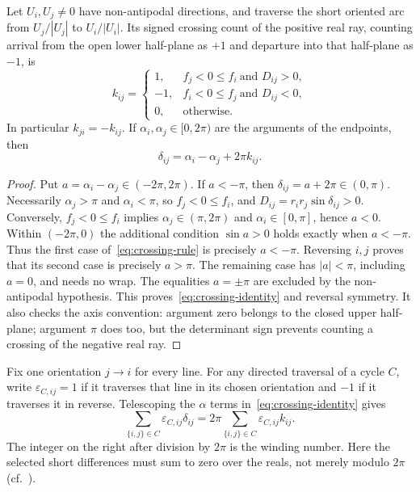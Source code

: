 \begin{lemma}
\label{lem:crossing}
Let $U_i,U_j\ne0$ have non-antipodal directions, and traverse the short
oriented arc from $U_j/|U_j|$ to $U_i/|U_i|$. Its signed crossing count of
the positive real ray, counting arrival from the open lower half-plane as
$+1$ and departure into that half-plane as $-1$, is
\begin{equation}
 k_{ij}=\begin{cases}
 1,& f_j<0\le f_i\ \text{and }D_{ij}>0,\\
 -1,& f_i<0\le f_j\ \text{and }D_{ij}<0,\\
 0,&\text{otherwise}.
 \end{cases}
 \label{eq:crossing-rule}
\end{equation}
In particular $k_{ji}=-k_{ij}$. If $\alpha_i,\alpha_j\in[0,2\pi)$ are the
arguments of the endpoints, then
\begin{equation}
 \delta_{ij}=\alpha_i-\alpha_j+2\pi k_{ij}.
 \label{eq:crossing-identity}
\end{equation}
\end{lemma}
\begin{proof}
Put $a=\alpha_i-\alpha_j\in(-2\pi,2\pi)$.
If $a< -\pi$, then $\delta_{ij}=a+2\pi\in(0,\pi)$.
Necessarily $\alpha_j>\pi$ and $\alpha_i<\pi$, so
$f_j<0\le f_i$, and $D_{ij}=r_ir_j\sin\delta_{ij}>0$.
Conversely, $f_j<0\le f_i$ implies $\alpha_j\in(\pi,2\pi)$ and
$\alpha_i\in[0,\pi]$, hence $a<0$. Within $(-2\pi,0)$ the additional
condition $\sin a>0$ holds exactly when $a< -\pi$.
Thus the first case of~\eqref{eq:crossing-rule} is precisely $a< -\pi$.
Reversing $i,j$ proves that its second case is precisely $a>\pi$.
The remaining case has $|a|<\pi$, including $a=0$, and needs no wrap.
The equalities $a=\pm\pi$ are excluded by the non-antipodal hypothesis.
This proves~\eqref{eq:crossing-identity} and reversal symmetry. It also
checks the axis convention: argument zero belongs to the closed upper
half-plane; argument $\pi$ does too, but the determinant sign prevents
counting a crossing of the negative real ray.
\end{proof}

Fix one orientation $j\to i$ for every line. For any directed traversal of
a cycle $C$, write $\varepsilon_{C,ij}=1$ if it traverses that line in its
chosen orientation and $-1$ if it traverses it in reverse. Telescoping the
$\alpha$ terms in~\eqref{eq:crossing-identity} gives
\begin{equation}
 \sum_{\{i,j\}\in C}\varepsilon_{C,ij}\delta_{ij}
 =2\pi\sum_{\{i,j\}\in C}\varepsilon_{C,ij}k_{ij}.
 \label{eq:cycle-winding}
\end{equation}
The integer on the right after division by $2\pi$ is the winding number.
Here the selected short differences must sum to zero over the reals, not
merely modulo $2\pi$ (cf.\ \citet[Theorem 2]{FarivarLow2013}).

